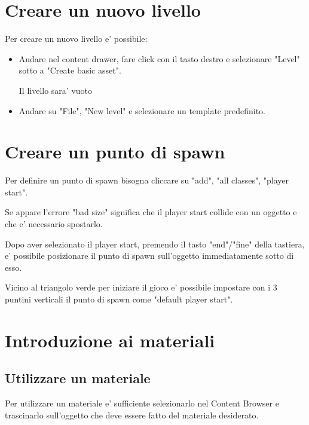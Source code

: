     \section{Creare un nuovo livello}
        Per creare un nuovo livello e' possibile:
        \begin{itemize}
            \item Andare nel content drawer, fare click con il tasto destro e selezionare "Level" sotto a "Create basic asset".

                \begin{notebox}
                    Il livello sara' vuoto
                \end{notebox}

            \item Andare su "File", "New level" e selezionare un template predefinito.
        \end{itemize}


    \section{Creare un punto di spawn}
        Per definire un punto di spawn bisogna cliccare su "add", "all classes", "player start".

        Se appare l'errore "bad size" significa che il player start collide con un oggetto e che e' necessario spostarlo.

        Dopo aver selezionato il player start, premendo il tasto "end"/"fine" della tastiera, e' possibile posizionare il punto di spawn sull'oggetto immediatamente sotto di esso.

        Vicino al triangolo verde per iniziare il gioco e' possibile impostare con i 3 puntini verticali il punto di spawn come "default player start".


    \section{Introduzione ai materiali}

        \subsection{Utilizzare un materiale}
            Per utilizzare un materiale e' sufficiente selezionarlo nel Content Browser e trascinarlo sull'oggetto che deve essere fatto del materiale desiderato.

